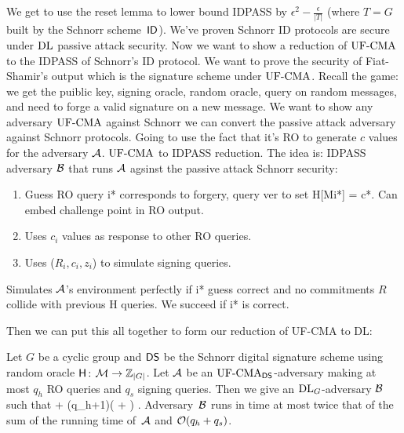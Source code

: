 We get to use the reset lemma to lower bound IDPASS by $\epsilon^2 - \frac{\epsilon}{|T|}$ (where $T=G$ built by the Schnorr scheme~$\textsf{ID}$). We've proven Schnorr ID protocols are secure under $\textnormal{DL}$ passive attack security. Now we want to show a reduction of $\textnormal{UF-CMA}$ to the IDPASS of Schnorr's ID protocol. We want to prove the security of Fiat-Shamir's output which is the signature scheme under $\textnormal{UF-CMA}$. Recall the game: we get the puiblic key, signing oracle, random oracle, query on random messages, and need to forge a valid signature on a new message.
We want to show any adversary $\textnormal{UF-CMA}$ against Schnorr we can convert the passive attack adversary against Schnorr protocols.
Going to use the fact that it's RO to generate $c$ values for the adversary ${\mathcal A}$. $\textnormal{UF-CMA}$ to IDPASS reduction. The idea is:
IDPASS adversary ${\mathcal B}$ that runs ${\mathcal A}$ agsinst the passive attack Schnorr security:
\begin{enumerate}
    \item Guess RO query i* corresponds to forgery, query ver to set H[Mi*] = c*. Can embed challenge point in RO output.
    \item Uses $c_i$ values as response to other RO queries.
    \item Uses ($R_i, c_i, z_i$) to simulate signing queries.
\end{enumerate}

Simulates ${\mathcal A}$'s environment perfectly if i* guess correct and no commitments $R$ collide with previous H queries.
We succeed if i* is correct.

Then we can put this all together to form our reduction of UF-CMA to DL:

\begin{theorem*}
\label{thm:ufcma-dl-adv}
Let $G$ be a cyclic group and ${\mathsf{DS}}$ be the Schnorr digital signature scheme
using random oracle $\mathsf{H} {{\kern .05em}\colon{\kern .05em}}{\cal M}\rightarrow{{\mathbb Z}}_{|G|}$.  
Let ${\mathcal A}$ be an $\textnormal{UF-CMA}_{{\mathsf{DS}}}$-adversary making at most $q_h$ RO queries and
$q_s$ signing queries.
Then we give an $\textnormal{DL}_G$-adversary ${\mathcal B}$ such that
\bnm
  \AdvUFCMA{\DS}{\advA} \le {} + (q_h+1)\left( + \right) \;.
\enm
Adversary~${\mathcal B}$ runs in time at most twice that of the sum of the running time
of~${\mathcal A}$ and ${\cal O}(q_h+q_s)$.
\end{theorem*}

